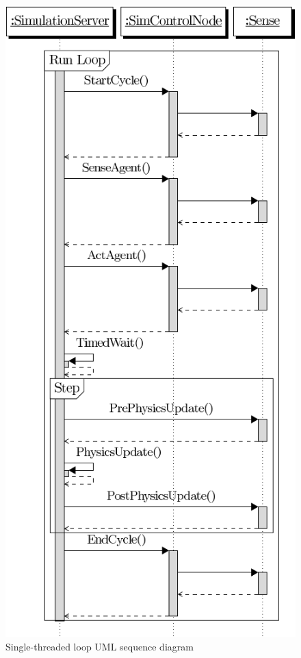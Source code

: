 \begin{figure}[htp]
  \centering
  \includegraphics[height=0.6\textheight]{fig/serverSingleThreadLoop}
  \caption{Single-threaded loop UML sequence diagram}
  \label{fig:single-thread-sd}
\end{figure}

